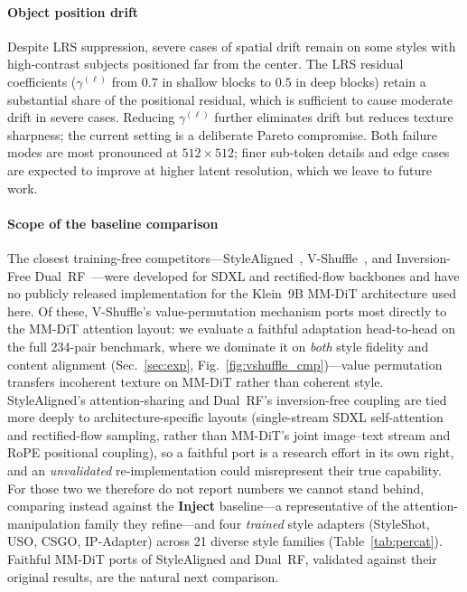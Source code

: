 \paragraph{Object position drift}
Despite LRS suppression, severe cases of spatial drift remain on some styles
with high-contrast subjects positioned far from the center.
The LRS residual coefficients ($\gamma^{(\ell)}$ from $0.7$ in shallow blocks
to $0.5$ in deep blocks) retain a substantial share of the positional
residual, which is sufficient to cause moderate drift in severe cases.
Reducing $\gamma^{(\ell)}$ further eliminates drift but reduces texture
sharpness; the current setting is a deliberate Pareto compromise.
Both failure modes are most pronounced at $512\times512$; finer sub-token
details and edge cases are expected to improve at higher latent resolution,
which we leave to future work.

\paragraph{Scope of the baseline comparison}
The closest training-free competitors---StyleAligned~\cite{hertz2024style},
V-Shuffle~\cite{vshuffle2025}, and Inversion-Free Dual~RF~\cite{dualrf2025}---were
developed for SDXL and rectified-flow backbones and have no publicly released
implementation for the Klein~9B MM-DiT architecture used here.
Of these, V-Shuffle's value-permutation mechanism ports most directly to the
MM-DiT attention layout: we evaluate a faithful adaptation head-to-head on the
full 234-pair benchmark, where we dominate it on \emph{both} style fidelity and
content alignment (Sec.~\ref{sec:exp}, Fig.~\ref{fig:vshuffle_cmp})---value
permutation transfers incoherent texture on MM-DiT rather than coherent style.
StyleAligned's attention-sharing and Dual~RF's inversion-free coupling are tied
more deeply to architecture-specific layouts (single-stream SDXL self-attention
and rectified-flow sampling, rather than MM-DiT's joint image--text stream and
RoPE positional coupling), so a faithful port is a research effort in its own
right, and an \emph{unvalidated} re-implementation could misrepresent their true
capability.
For those two we therefore do not report numbers we cannot stand behind,
comparing instead against the \textbf{Inject} baseline---a representative of the
attention-manipulation family they refine---and four \emph{trained} style
adapters (StyleShot, USO, CSGO, IP-Adapter) across 21 diverse style families
(Table~\ref{tab:percat}).
Faithful MM-DiT ports of StyleAligned and Dual~RF, validated against their
original results, are the natural next comparison.
